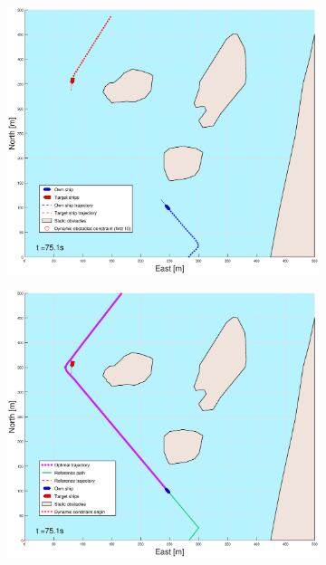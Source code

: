 \begin{figure}[!b]
\begin{subfigure}[b]{0.499\textwidth}
    \end{subfigure}
    \hfill
    \\
    \begin{subfigure}[b]{0.49\textwidth}
        \centering
        \includegraphics[width=\textwidth]{Images/Figures/Helloya/_Simple_0fig1_time=75}
    \end{subfigure}
    \hfill
    \begin{subfigure}[b]{0.499\textwidth}
        \centering
        \includegraphics[width=\textwidth]{Images/Figures/Helloya/_Simple_0fig999_time=75}
    \end{subfigure}
    \hfill
\end{figure}%
